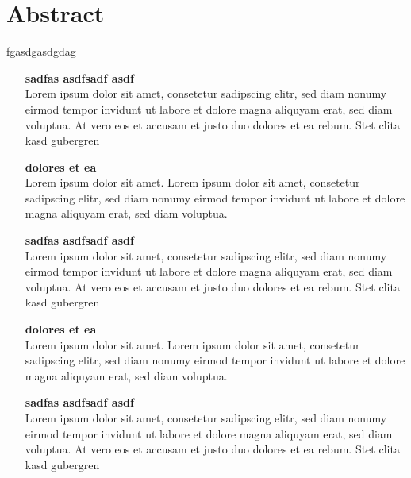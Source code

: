 \chapter*{Abstract}
\thispagestyle{empty}
fgasdgasdgdag
\begin{itemize}

\item[\textsf{\textbf{\large sadfas asdfsadf asdf}}] \quad \\
Lorem ipsum dolor sit amet, consetetur sadipscing elitr, sed diam nonumy eirmod tempor invidunt ut labore et dolore magna aliquyam erat, sed diam voluptua. At vero eos et accusam et justo duo dolores et ea rebum. Stet clita kasd gubergren

\item[\textsf{\textbf{\large dolores et ea}}] \quad \\
Lorem ipsum dolor sit amet. Lorem ipsum dolor sit amet, consetetur sadipscing elitr, sed diam nonumy eirmod tempor invidunt ut labore et dolore magna aliquyam erat, sed diam voluptua.

\item[\textsf{\textbf{\large sadfas asdfsadf asdf}}] \quad \\
Lorem ipsum dolor sit amet, consetetur sadipscing elitr, sed diam nonumy eirmod tempor invidunt ut labore et dolore magna aliquyam erat, sed diam voluptua. At vero eos et accusam et justo duo dolores et ea rebum. Stet clita kasd gubergren

\item[\textsf{\textbf{\large dolores et ea}}] \quad \\
Lorem ipsum dolor sit amet. Lorem ipsum dolor sit amet, consetetur sadipscing elitr, sed diam nonumy eirmod tempor invidunt ut labore et dolore magna aliquyam erat, sed diam voluptua.

\item[\textsf{\textbf{\large sadfas asdfsadf asdf}}] \quad \\
Lorem ipsum dolor sit amet, consetetur sadipscing elitr, sed diam nonumy eirmod tempor invidunt ut labore et dolore magna aliquyam erat, sed diam voluptua. At vero eos et accusam et justo duo dolores et ea rebum. Stet clita kasd gubergren

\end{itemize}


\newpage                
\thispagestyle{empty}
\mbox{}
